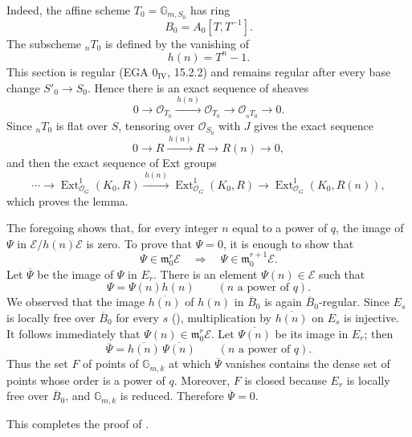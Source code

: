 Indeed, the affine scheme \(T_0=\mathbb G_{m,S_0}\) has ring
\[
  B_0=A_0[T,T^{-1}].
\]
The subscheme \({}_nT_0\) is defined by the vanishing of
\[
  h(n)=T^n-1.
\]
This section is regular (EGA \(0_{\mathrm{IV}}\), 15.2.2) and remains
regular after every base change \(S'_0\to S_0\). Hence there is an
exact sequence of sheaves
\[
  0\longrightarrow\mathcal O_{T_0}
  \xrightarrow{\,h(n)\,}\mathcal O_{T_0}
  \longrightarrow\mathcal O_{{}_nT_0}
  \longrightarrow0.
\]
Since \({}_nT_0\) is flat over \(S\), tensoring over
\(\mathcal O_{S_0}\) with \(J\) gives the exact sequence
\[
  0\longrightarrow R\xrightarrow{\,h(n)\,}R
  \longrightarrow R(n)\longrightarrow0,
\]
and then the exact sequence of Ext groups
\[
  \cdots\longrightarrow
  \operatorname{Ext}^{1}_{\mathcal O_G}(K_0,R)
  \xrightarrow{\,h(n)\,}
  \operatorname{Ext}^{1}_{\mathcal O_G}(K_0,R)
  \longrightarrow
  \operatorname{Ext}^{1}_{\mathcal O_G}(K_0,R(n)),
\]
which proves the lemma.

The foregoing shows that, for every integer \(n\) equal to a power of
\(q\), the image of \(\Psi\) in
\(\mathscr E/h(n)\mathscr E\) is zero. To prove that \(\Psi=0\), it
is enough to show that
\[
  \Psi\in\mathfrak m_0^r\mathscr E
  \quad\Longrightarrow\quad
  \Psi\in\mathfrak m_0^{r+1}\mathscr E.
\]
Let \(\overline\Psi\) be the image of \(\Psi\) in \(E_r\). There is
an element \(\Psi(n)\in\mathscr E\) such that
\[
  \Psi=\Psi(n)h(n)
  \qquad(n\text{ a power of }q).
\]
We observed that the image \(\overline{h(n)}\) of \(h(n)\) in \(\overline B_0\)
is again \(\overline B_0\)-regular. Since \(E_s\) is locally free over \(\overline B_0\)
for every \(s\) (), multiplication by \(\overline{h(n)}\) on
\(E_s\) is injective. It follows immediately that
\(\Psi(n)\in\mathfrak m_0^r\mathscr E\). Let
\(\overline{\Psi(n)}\) be its image in \(E_r\); then
\[
  \overline\Psi=\overline{h(n)}\,\overline{\Psi(n)}
  \qquad(n\text{ a power of }q).
\]
Thus the set \(F\) of points of \(\mathbb G_{m,k}\) at which
\(\overline\Psi\) vanishes contains the dense set of points whose
order is a power of \(q\). Moreover, \(F\) is closed because \(E_r\)
is locally free over \(\overline B_0\), and \(\mathbb G_{m,k}\) is reduced.
Therefore \(\overline\Psi=0\).

This completes the proof of .


